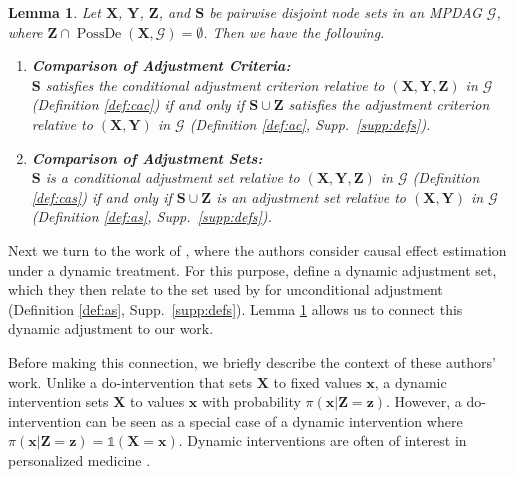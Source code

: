\documentclass[twoside]{article}
\newtheorem{lemma}[theorem]{Lemma}
\DeclareMathOperator{\PossDe}{PossDe}
\newcommand{\mb}[1]{\mathbf{#1}}
\newcommand{\g}[1][G]{\mathcal{#1}}
\begin{document}
\begin{lemma}
\label{lem:comparison}
    Let $\mb{X}$, $\mb{Y}$, $\mb{Z}$, and $\mb{S}$ be pairwise disjoint node sets in an MPDAG $\g$, where $\mb{Z} \cap \PossDe(\mb{X}, \g) = \emptyset$. Then we have the following.
    \begin{enumerate}[label=\emph{(\alph*)}]
        \item \textbf{Comparison of Adjustment Criteria:}\\ 
        $\mb{S}$ satisfies the conditional adjustment criterion relative to $(\mb{X,Y,Z})$ in $\g$ (Definition \ref{def:cac}) if and only if $\mb{S} \cup \mb{Z}$ satisfies the adjustment criterion relative to $(\mb{X}, \mb{Y})$ in $\g$ (Definition \ref{def:ac}, Supp.\ \ref{supp:defs}). \label{lem:comparison-a}
        
        \item \textbf{Comparison of Adjustment Sets:}\\
        $\mb{S}$ is a conditional adjustment set relative to $(\mb{X,Y,Z})$ in $\g$ (Definition \ref{def:cas}) if and only if $\mb{S} \cup \mb{Z}$ is an adjustment set relative to $(\mb{X}, \mb{Y})$ in $\g$ (Definition \ref{def:as}, Supp.\ \ref{supp:defs}). \label{lem:comparison-b}
    \end{enumerate}
\end{lemma}

Next we turn to the work of \cite{smucler2020efficient}, where the authors consider causal effect estimation under a dynamic treatment. For this purpose, \cite{smucler2020efficient} define a dynamic adjustment set, which they then relate to the set used by \cite{maathuis2015generalized} for unconditional adjustment (Definition \ref{def:as}, Supp.\ \ref{supp:defs}). Lemma \ref{lem:comparison} allows us to connect this dynamic adjustment to our work.

Before making this connection, we briefly describe the context of these authors' work. Unlike a do-intervention that sets $\mb{X}$ to fixed values $\mb{x}$, a dynamic intervention sets $\mb{X}$ to values $\mb{x}$ with probability $\pi(\mb{x} | \mb{Z} = \mb{z})$. However, a do-intervention can be seen as a special case of a dynamic intervention where $\pi(\mb{x} |\mb{Z} = \mb{z}) = \mathds{1}(\mb{X} =\mb{x})$. Dynamic interventions are often of interest in personalized medicine \citep{robins1993analytic, murphy2001marginal, chakraborty2013statistical}.
\end{document}
